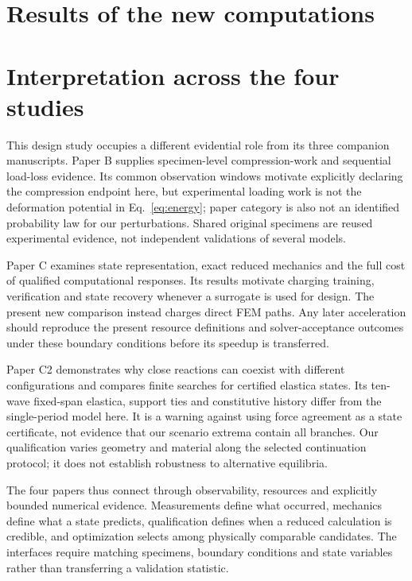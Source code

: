 \documentclass[10pt,twocolumn]{article}
\begin{document}
\section{Results of the new computations}


\section{Interpretation across the four studies}
This design study occupies a different evidential role from its three companion manuscripts. Paper B \citep{CompanionB} supplies specimen-level compression-work and sequential load-loss evidence. Its common observation windows motivate explicitly declaring the compression endpoint here, but experimental loading work is not the deformation potential in Eq.~\eqref{eq:energy}; paper category is also not an identified probability law for our perturbations. Shared original specimens are reused experimental evidence, not independent validations of several models.

Paper C \citep{CompanionC} examines state representation, exact reduced mechanics and the full cost of qualified computational responses. Its results motivate charging training, verification and state recovery whenever a surrogate is used for design. The present new comparison instead charges direct FEM paths. Any later acceleration should reproduce the present resource definitions and solver-acceptance outcomes under these boundary conditions before its speedup is transferred.

Paper C2 \citep{CompanionCtwo} demonstrates why close reactions can coexist with different configurations and compares finite searches for certified elastica states. Its ten-wave fixed-span elastica, support ties and constitutive history differ from the single-period model here. It is a warning against using force agreement as a state certificate, not evidence that our scenario extrema contain all branches. Our qualification varies geometry and material along the selected continuation protocol; it does not establish robustness to alternative equilibria.

The four papers thus connect through observability, resources and explicitly bounded numerical evidence. Measurements define what occurred, mechanics define what a state predicts, qualification defines when a reduced calculation is credible, and optimization selects among physically comparable candidates. The interfaces require matching specimens, boundary conditions and state variables rather than transferring a validation statistic.
\end{document}
